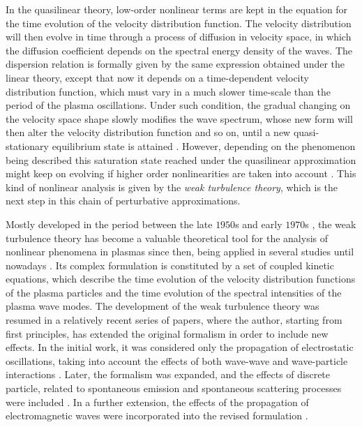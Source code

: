 \documentclass[12pt,a4paper,ruledheader]{report}
\begin{document}
In the quasilinear theory, low-order nonlinear terms are kept in
the equation for the time evolution of the velocity distribution
function. The velocity distribution will then evolve in time through
a process of diffusion in velocity space, in which the diffusion
coefficient depends on the spectral energy density of the waves.
The dispersion relation is formally given by the same expression
obtained under the linear theory, except that now it depends on a
time-dependent velocity distribution function, which must vary in a
much slower time-scale than the period of the plasma oscillations.
Under such condition, the gradual changing on the velocity space
shape slowly modifies the wave spectrum, whose new form will then
alter the velocity distribution function and so on, until a new
quasi-stationary equilibrium state is attained \cite{gurnett2017}.
However, depending on the phenomenon being described this saturation
state reached under the quasilinear approximation might keep on
evolving if higher order nonlinearities are taken into account
\cite{akhi2}. This kind of nonlinear analysis is given by the
\emph{weak turbulence theory}, which is the next step in this chain
of perturbative approximations.

Mostly developed in the period between the late $1950$s and early
$1970$s \cite{Kadomtsev1965,Tsytovich1967,saggal,tsynlep,david,
  tsyitotp,akhi2,tsytotp,mel}, the weak turbulence theory has
become a valuable theoretical tool for the analysis of nonlinear
phenomena in plasmas since then, being applied in several studies
until nowadays \cite{Grognard1982,McClements87b,Hanssen1991,
  Edney2001,Kontar2001,Kontar2002,THD13}. Its complex formulation
is constituted by a set of coupled kinetic equations, which describe
the time evolution of the velocity distribution functions of the
plasma particles and the time evolution of the spectral intensities of
the plasma wave modes. The development of the weak turbulence theory
was resumed in a relatively recent series of papers, where the author,
starting from first principles, has extended the original formalism in
order to include new effects. In the initial work, it was considered
only the propagation of electrostatic oscillations, taking into account
the effects of both wave-wave and wave-particle interactions \cite{Yoon00}.
Later, the formalism was expanded, and the effects of discrete particle,
related to spontaneous emission and spontaneous scattering processes
were included \cite{Yoon05a}. In a further extension, the effects of
the propagation of electromagnetic waves were incorporated into the
revised formulation \cite{Yoon06,Yoon2012b}.
\end{document}
